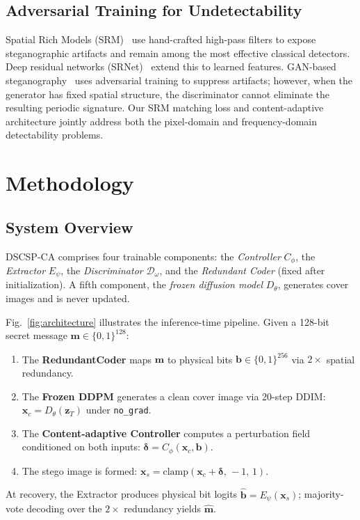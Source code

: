 \documentclass[journal]{IEEEtran}
\begin{document}
\subsection{Adversarial Training for Undetectability}

Spatial Rich Models (SRM)~\cite{fridrich2012rich} use hand-crafted high-pass filters to
expose steganographic artifacts and remain among the most effective classical detectors.
Deep residual networks (SRNet)~\cite{boroumand2019deep} extend this to learned features.
GAN-based steganography~\cite{zhang2019steganogan,goodfellow2014generative} uses adversarial
training to suppress artifacts; however, when the generator has fixed spatial structure, the
discriminator cannot eliminate the resulting periodic signature.
Our SRM matching loss and content-adaptive architecture jointly address both the pixel-domain
and frequency-domain detectability problems.


\section{Methodology}
\label{sec:method}

\subsection{System Overview}
\label{sec:overview}

DSCSP-CA comprises four trainable components: the \emph{Controller} $C_\phi$, the
\emph{Extractor} $E_\psi$, the \emph{Discriminator} $\mathcal{D}_\omega$, and the
\emph{Redundant Coder} (fixed after initialization).
A fifth component, the \emph{frozen diffusion model} $D_\theta$, generates cover images and
is never updated.

Fig.~\ref{fig:architecture} illustrates the inference-time pipeline.
Given a 128-bit secret message $\mathbf{m}\in\{0,1\}^{128}$:
\begin{enumerate}[itemsep=1pt,topsep=2pt]
    \item The \textbf{RedundantCoder} maps $\mathbf{m}$ to physical bits
          $\mathbf{b}\in\{0,1\}^{256}$ via $2\times$ spatial redundancy.
    \item The \textbf{Frozen DDPM} generates a clean cover image via 20-step DDIM:
          $\mathbf{x}_c = D_\theta(\mathbf{z}_T)$ under \texttt{no\_grad}.
    \item The \textbf{Content-adaptive Controller} computes a perturbation field conditioned
          on both inputs: $\bm{\delta} = C_\phi(\mathbf{x}_c, \mathbf{b})$.
    \item The stego image is formed:
          $\mathbf{x}_s = \mathrm{clamp}(\mathbf{x}_c + \bm{\delta},\,-1,\,1)$.
\end{enumerate}
At recovery, the Extractor produces physical bit logits $\hat{\mathbf{b}} =
E_\psi(\mathbf{x}_s)$; majority-vote decoding over the $2\times$ redundancy yields
$\hat{\mathbf{m}}$.
\end{document}
